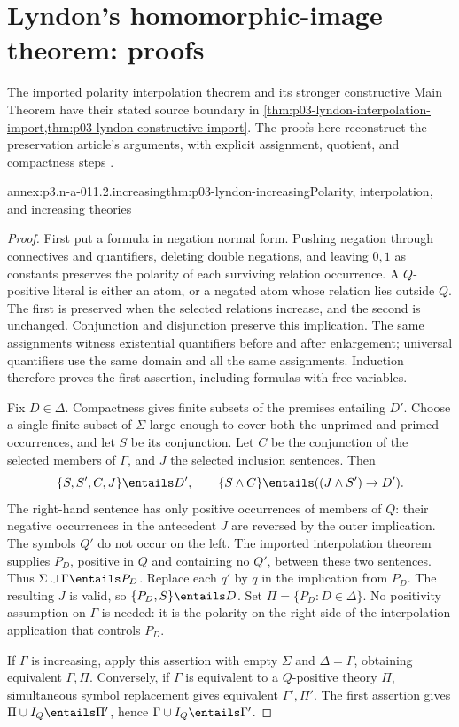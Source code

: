 \section{Lyndon's homomorphic-image theorem: proofs}
\label{sec:annex-p03-n-a-011-02}

The imported polarity interpolation theorem and its stronger constructive
Main Theorem have their stated source boundary in
\cref{thm:p03-lyndon-interpolation-import,thm:p03-lyndon-constructive-import}.
The proofs here reconstruct the preservation article's arguments, with
explicit assignment, quotient, and compactness steps
\cite[pp.~145--153]{Lyndon1959}.

\begin{annexitem}{annex:p3.n-a-011.2.increasing}{thm:p03-lyndon-increasing}{Polarity, interpolation, and increasing theories}
\begin{proof}
First put a formula in negation normal form. Pushing negation through
connectives and quantifiers, deleting double negations, and leaving
\(0,1\) as constants preserves the polarity of each surviving relation
occurrence. A \(Q\)-positive literal is either an atom, or a negated atom
whose relation lies outside \(Q\). The first is preserved when the
selected relations increase, and the second is unchanged. Conjunction
and disjunction preserve this implication. The same assignments witness
existential quantifiers before and after enlargement; universal
quantifiers use the same domain and all the same assignments. Induction
therefore proves the first assertion, including formulas with free variables.

Fix \(D\in\Delta\). Compactness gives finite subsets of the premises
entailing \(D'\). Choose a single finite subset of \(\Sigma\) large
enough to cover both the unprimed and primed occurrences, and let \(S\)
be its conjunction. Let \(C\) be the conjunction of the selected members
of \(\Gamma\), and \(J\) the selected inclusion sentences. Then
\[
 \{S,S',C,J\}\entails D',\qquad
 \{S\land C\}\entails ((J\land S')\to D').
\]
The right-hand sentence has only positive occurrences of members of
\(Q\): their negative occurrences in the antecedent \(J\) are reversed
by the outer implication. The symbols \(Q'\) do not occur on the left.
The imported interpolation theorem supplies \(P_D\), positive in \(Q\)
and containing no \(Q'\), between these two sentences. Thus
\(\Sigma\cup\Gamma\entails P_D\). Replace each \(q'\) by \(q\)
in the implication from \(P_D\). The resulting \(J\) is valid, so
\(\{P_D,S\}\entails D\). Set \(\Pi=\{P_D:D\in\Delta\}\).
No positivity assumption on \(\Gamma\) is needed: it is the polarity
on the right side of the interpolation application that controls \(P_D\).

If \(\Gamma\) is increasing, apply this assertion with empty
\(\Sigma\) and \(\Delta=\Gamma\), obtaining equivalent
\(\Gamma,\Pi\). Conversely, if \(\Gamma\) is equivalent to a
\(Q\)-positive theory \(\Pi\), simultaneous symbol replacement gives
equivalent \(\Gamma',\Pi'\). The first assertion gives
\(\Pi\cup I_Q\entails\Pi'\), hence
\(\Gamma\cup I_Q\entails\Gamma'\).
\end{proof}
\end{annexitem}

